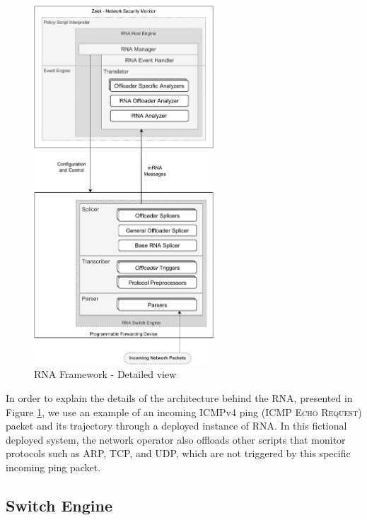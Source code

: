 \begin{figure}[H]
    \caption{RNA Framework - Detailed view}
    \begin{center}
        \includegraphics[width=0.6\textwidth]{images/arch_low_level.pdf}  
    \end{center}
    \label{fig:arch_low_level}
\end{figure}

In order to explain the details of the architecture behind the RNA, presented in Figure \ref{fig:arch_low_level}, we use an example of an incoming ICMPv4 ping (\textsc{ICMP Echo Request}) packet and its trajectory through a deployed instance of RNA. In this fictional deployed system, the network operator also offloads other scripts that monitor protocols such as ARP, TCP, and UDP, which are not triggered by this specific incoming ping packet.

\subsection{Switch Engine}

